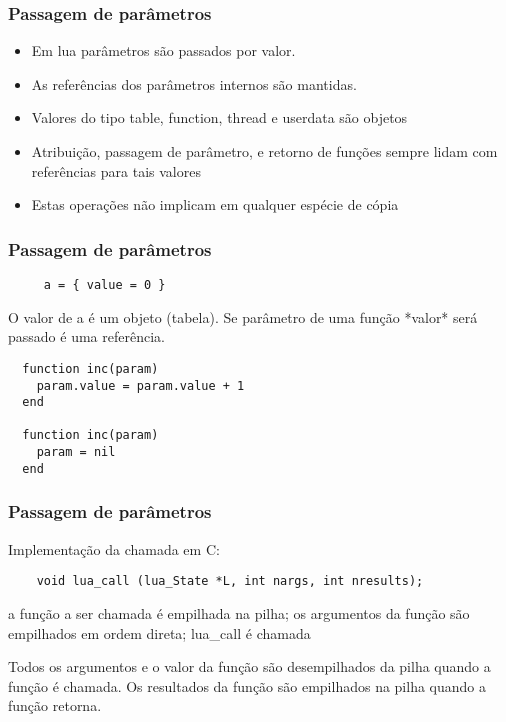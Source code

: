 \begin{frame}
  \frametitle{Passagem de parâmetros}
  \begin{block}{}
    \begin{itemize}
    \item Em lua parâmetros são passados por valor.
    \item As referências dos parâmetros internos são mantidas.
    \item Valores do tipo table, function, thread e userdata são objetos
    \item Atribuição, passagem de parâmetro, e retorno de
          funções sempre lidam com referências para tais valores
    \item Estas operações não implicam em qualquer espécie de cópia
    \end{itemize}
  \end{block}
\end{frame}

\begin{frame}[fragile]
  \frametitle{Passagem de parâmetros}
   \begin{lstlisting}
     a = { value = 0 }
   \end{lstlisting}
   \begin{block}{}
     O valor de a é um objeto (tabela). Se parâmetro de
     uma função *valor* será passado é uma
     referência.
   \end{block}

  \begin{lstlisting}
  function inc(param)
    param.value = param.value + 1
  end
  
  function inc(param)
    param = nil
  end
  \end{lstlisting}
\end{frame}

\begin{frame}[fragile]
  \frametitle{Passagem de parâmetros}
  \begin{block}{}
    Implementação da chamada em C:
    
    \begin{lstlisting}
    void lua_call (lua_State *L, int nargs, int nresults);
    \end{lstlisting}
    
    a função a ser chamada é empilhada na pilha;
    os argumentos da função são empilhados em ordem direta;
    lua\_call é chamada 
    
    Todos os argumentos e o valor da função são desempilhados
    da pilha quando a função é chamada. 
    Os resultados da função são empilhados na pilha quando
    a função retorna. 
  \end{block}
\end{frame}
